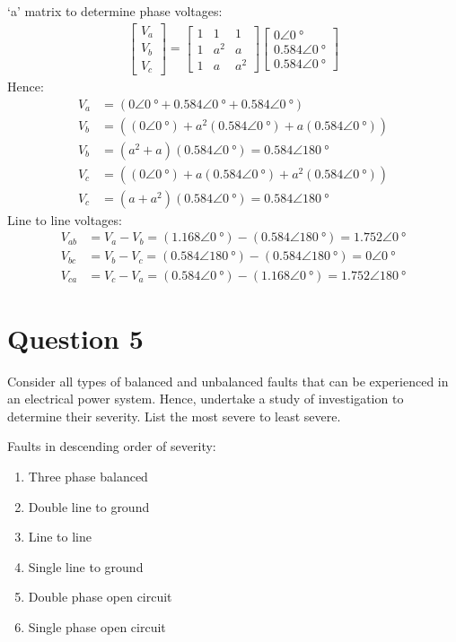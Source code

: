 `a' matrix to determine phase voltages:
\begin{gather}
    \begin{bmatrix}
        V_a \\
        V_b \\
        V_c
    \end{bmatrix} = \begin{bmatrix}
        1 & 1   & 1   \\
        1 & a^2 & a   \\
        1 & a   & a^2
    \end{bmatrix}\begin{bmatrix}
        0\angle\SI{0}{\degree}     \\
        0.584\angle\SI{0}{\degree} \\
        0.584\angle\SI{0}{\degree}
    \end{bmatrix}
\end{gather}
Hence:
\begin{align}
    V_a & = \left(0\angle\SI{0}{\degree}+0.584\angle\SI{0}{\degree}+0.584\angle\SI{0}{\degree}\right)                                            \\
    V_b & = \left(\left(0\angle\SI{0}{\degree}\right)+a^2\left(0.584\angle\SI{0}{\degree}\right)+a\left(0.584\angle\SI{0}{\degree}\right)\right) \\
    V_b & = \left(a^2 + a\right)\left(0.584\angle\SI{0}{\degree}\right) = 0.584\angle\SI{180}{\degree}                                           \\
    V_c & = \left(\left(0\angle\SI{0}{\degree}\right)+a\left(0.584\angle\SI{0}{\degree}\right)+a^2\left(0.584\angle\SI{0}{\degree}\right)\right) \\
    V_c & = \left(a + a^2\right)\left(0.584\angle\SI{0}{\degree}\right) = 0.584\angle\SI{180}{\degree}
\end{align}
Line to line voltages:
\begin{align}
    V_{ab} & = V_a - V_b = \left(1.168\angle\SI{0}{\degree}\right) - \left(0.584\angle\SI{180}{\degree}\right) = 1.752\angle\SI{0}{\degree} \\
    V_{bc} & = V_b - V_c = \left(0.584\angle\SI{180}{\degree}\right) - \left(0.584\angle\SI{180}{\degree}\right) = 0\angle\SI{0}{\degree}   \\
    V_{ca} & = V_c - V_a = \left(0.584\angle\SI{0}{\degree}\right) - \left(1.168\angle\SI{0}{\degree}\right) = 1.752\angle\SI{180}{\degree}
\end{align}
\section{Question 5}
Consider all types of balanced and unbalanced faults that can be experienced in an electrical power system. Hence, undertake a study of investigation to determine their severity. List the most severe to least severe.

Faults in descending order of severity:
\begin{enumerate}
    \item Three phase balanced
    \item Double line to ground
    \item Line to line
    \item Single line to ground
    \item Double phase open circuit
    \item Single phase open circuit
\end{enumerate}